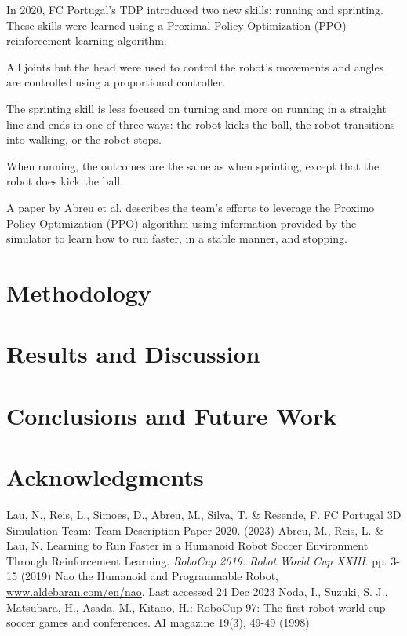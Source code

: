 \documentclass[conference]{IEEEtran}
\begin{document}
In 2020, FC Portugal's TDP \cite{lau2020fc} introduced two new skills: running and sprinting. These skills were learned using
a Proximal Policy Optimization (PPO) reinforcement learning algorithm.

All joints but the head were used to control the robot's movements and angles are controlled using a proportional controller.

The sprinting skill is less focused on turning and more on running in a straight line and ends in one of three ways: 
the robot kicks the ball, the robot transitions into walking, or the robot stops.

When running, the outcomes are the same as when sprinting, except that the robot does kick the ball.

A paper by Abreu et al. \cite{10.1007/978-3-030-35699-6_1} describes the team's efforts to leverage the Proximo Policy Optimization (PPO) 
algorithm using information provided by the simulator to learn how to run faster, in a stable manner, and stopping.

\section{Methodology}\label{Methodology}

\section{Results and Discussion}\label{Results and Discussion}

\section{Conclusions and Future Work}\label{Conclusions and Future Work}

\section{Acknowledgments}\label{Acknowledgments}

\begin{thebibliography}{00}
    Lau, N., Reis, L., Simoes, D., Abreu, M., Silva, T. \& Resende, F. FC Portugal 3D Simulation Team: Team Description Paper 2020.  (2023)
    Abreu, M., Reis, L. \& Lau, N. Learning to Run Faster in a Humanoid Robot Soccer Environment Through Reinforcement Learning. {\em RoboCup 2019: Robot World Cup XXIII}. pp. 3-15 (2019)
     Nao the Humanoid and Programmable Robot, \href{www.aldebaran.com/en/nao}{www.aldebaran.com/en/nao}. Last accessed 24 Dec 2023
     Noda, I., Suzuki, S. J., Matsubara, H., Asada, M., Kitano, H.: RoboCup-97: The first robot world cup soccer games and conferences. AI magazine 19(3), 49-49 (1998)
\end{thebibliography}
\end{document}
